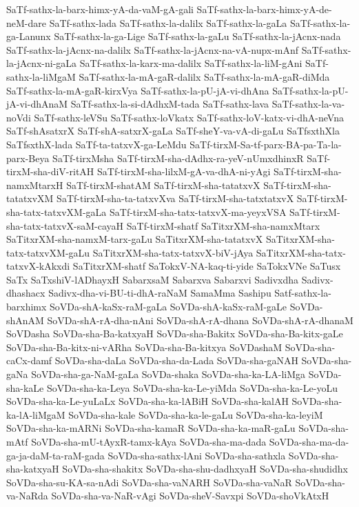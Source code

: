 {SaTf-sathx-la-barx-himx-yA-da-vaM-gA-gali
SaTf-sathx-la-barx-himx-yA-de-neM-dare
SaTf-sathx-lada
SaTf-sathx-la-dalilx
SaTf-sathx-la-gaLa
SaTf-sathx-la-ga-Lanunx
SaTf-sathx-la-ga-Lige
SaTf-sathx-la-gaLu
SaTf-sathx-la-jAcnx-nada
SaTf-sathx-la-jAcnx-na-dalilx
SaTf-sathx-la-jAcnx-na-vA-nupx-mAnf
SaTf-sathx-la-jAcnx-ni-gaLa
SaTf-sathx-la-karx-ma-dalilx
SaTf-sathx-la-liM-gAni
SaTf-sathx-la-liMgaM
SaTf-sathx-la-mA-gaR-dalilx
SaTf-sathx-la-mA-gaR-diMda
SaTf-sathx-la-mA-gaR-kirxVya
SaTf-sathx-la-pU-jA-vi-dhAna
SaTf-sathx-la-pU-jA-vi-dhAnaM
SaTf-sathx-la-si-dAdhxM-tada
SaTf-sathx-lava
SaTf-sathx-la-va-noVdi
SaTf-sathx-leVSu
SaTf-sathx-loVkatx
SaTf-sathx-loV-katx-vi-dhA-neVna
SaTf-shAsatxrX
SaTf-shA-satxrX-gaLa
SaTf-sheY-va-vA-di-gaLu
SaTfsxthXla
SaTfsxthX-lada
SaTf-ta-tatxvX-ga-LeMdu
SaTf-tirxM-Sa-tf-parx-BA-pa-Ta-la-parx-Beya
SaTf-tirxMsha
SaTf-tirxM-sha-dAdhx-ra-yeV-nUmxdhinxR
SaTf-tirxM-sha-diV-ritAH
SaTf-tirxM-sha-lilxM-gA-va-dhA-ni-yAgi
SaTf-tirxM-sha-namxMtarxH
SaTf-tirxM-shatAM
SaTf-tirxM-sha-tatatxvX
SaTf-tirxM-sha-tatatxvXM
SaTf-tirxM-sha-ta-tatxvXva
SaTf-tirxM-sha-tatxtatxvX
SaTf-tirxM-sha-tatx-tatxvXM-gaLa
SaTf-tirxM-sha-tatx-tatxvX-ma-yeyxVSA
SaTf-tirxM-sha-tatx-tatxvX-saM-cayaH
SaTf-tirxM-shatf
SaTitxrXM-sha-namxMtarx
SaTitxrXM-sha-namxM-tarx-gaLu
SaTitxrXM-sha-tatatxvX
SaTitxrXM-sha-tatx-tatxvXM-gaLu
SaTitxrXM-sha-tatx-tatxvX-biV-jAya
SaTitxrXM-sha-tatx-tatxvX-kAkxdi
SaTitxrXM-shatf
SaTokxV-NA-kaq-ti-yide
SaTokxVNe
SaTusx
SaTx
SaTxshiV-lADhayxH
SabarxsaM
Sabarxva
Sabarxvi
Sadivxdha
Sadivx-dhashacx
Sadivx-dha-vi-BU-ti-dhA-raNaM
SamaMma
Sashipu
Satf-sathx-la-barxhimx
SoVDa-shA-kaSx-raM-gaLa
SoVDa-shA-kaSx-raM-gaLe
SoVDa-shAnAM
SoVDa-shA-rA-dha-nAni
SoVDa-shA-rA-dhana
SoVDa-shA-rA-dhanaM
SoVDasha
SoVDa-sha-Ba-katxyaH
SoVDa-sha-Bakitx
SoVDa-sha-Ba-kitx-gaLe
SoVDa-sha-Ba-kitx-ni-vARha
SoVDa-sha-Ba-kitxya
SoVDashaM
SoVDa-sha-caCx-damf
SoVDa-sha-daLa
SoVDa-sha-da-Lada
SoVDa-sha-gaNAH
SoVDa-sha-gaNa
SoVDa-sha-ga-NaM-gaLa
SoVDa-shaka
SoVDa-sha-ka-LA-liMga
SoVDa-sha-kaLe
SoVDa-sha-ka-Leya
SoVDa-sha-ka-Le-yiMda
SoVDa-sha-ka-Le-yoLu
SoVDa-sha-ka-Le-yuLaLx
SoVDa-sha-ka-lABiH
SoVDa-sha-kalAH
SoVDa-sha-ka-lA-liMgaM
SoVDa-sha-kale
SoVDa-sha-ka-le-gaLu
SoVDa-sha-ka-leyiM
SoVDa-sha-ka-mARNi
SoVDa-sha-kamaR
SoVDa-sha-ka-maR-gaLu
SoVDa-sha-mAtf
SoVDa-sha-mU-tAyxR-tamx-kAya
SoVDa-sha-ma-dada
SoVDa-sha-ma-da-ga-ja-daM-ta-raM-gada
SoVDa-sha-sathx-lAni
SoVDa-sha-sathxla
SoVDa-sha-sha-katxyaH
SoVDa-sha-shakitx
SoVDa-sha-shu-dadhxyaH
SoVDa-sha-shudidhx
SoVDa-sha-su-KA-sa-nAdi
SoVDa-sha-vaNARH
SoVDa-sha-vaNaR
SoVDa-sha-va-NaRda
SoVDa-sha-va-NaR-vAgi
SoVDa-sheV-Savxpi
SoVDa-shoVkAtxH
}
